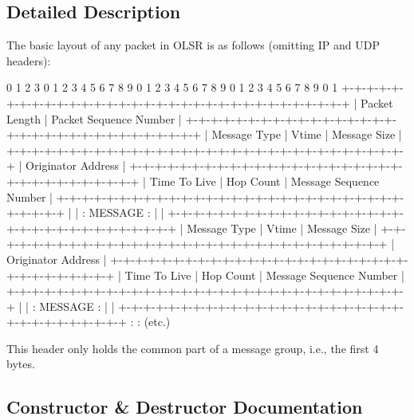 \subsection{Detailed Description}
The basic layout of any packet in O\+L\+SR is as follows (omitting IP and U\+DP headers)\+: \begin{DoxyVerb}  0                   1                   2                   3
  0 1 2 3 4 5 6 7 8 9 0 1 2 3 4 5 6 7 8 9 0 1 2 3 4 5 6 7 8 9 0 1
 +-+-+-+-+-+-+-+-+-+-+-+-+-+-+-+-+-+-+-+-+-+-+-+-+-+-+-+-+-+-+-+-+
 |         Packet Length         |    Packet Sequence Number     |
 +-+-+-+-+-+-+-+-+-+-+-+-+-+-+-+-+-+-+-+-+-+-+-+-+-+-+-+-+-+-+-+-+
 |  Message Type |     Vtime     |         Message Size          |
 +-+-+-+-+-+-+-+-+-+-+-+-+-+-+-+-+-+-+-+-+-+-+-+-+-+-+-+-+-+-+-+-+
 |                      Originator Address                       |
 +-+-+-+-+-+-+-+-+-+-+-+-+-+-+-+-+-+-+-+-+-+-+-+-+-+-+-+-+-+-+-+-+
 |  Time To Live |   Hop Count   |    Message Sequence Number    |
 +-+-+-+-+-+-+-+-+-+-+-+-+-+-+-+-+-+-+-+-+-+-+-+-+-+-+-+-+-+-+-+-+
 |                                                               |
 :                            MESSAGE                            :
 |                                                               |
 +-+-+-+-+-+-+-+-+-+-+-+-+-+-+-+-+-+-+-+-+-+-+-+-+-+-+-+-+-+-+-+-+
 |  Message Type |     Vtime     |         Message Size          |
 +-+-+-+-+-+-+-+-+-+-+-+-+-+-+-+-+-+-+-+-+-+-+-+-+-+-+-+-+-+-+-+-+
 |                      Originator Address                       |
 +-+-+-+-+-+-+-+-+-+-+-+-+-+-+-+-+-+-+-+-+-+-+-+-+-+-+-+-+-+-+-+-+
 |  Time To Live |   Hop Count   |    Message Sequence Number    |
 +-+-+-+-+-+-+-+-+-+-+-+-+-+-+-+-+-+-+-+-+-+-+-+-+-+-+-+-+-+-+-+-+
 |                                                               |
 :                            MESSAGE                            :
 |                                                               |
 +-+-+-+-+-+-+-+-+-+-+-+-+-+-+-+-+-+-+-+-+-+-+-+-+-+-+-+-+-+-+-+-+
 :                                                               :
          (etc.)
\end{DoxyVerb}


This header only holds the common part of a message group, i.\+e., the first 4 bytes. 

\subsection{Constructor \& Destructor Documentation}
